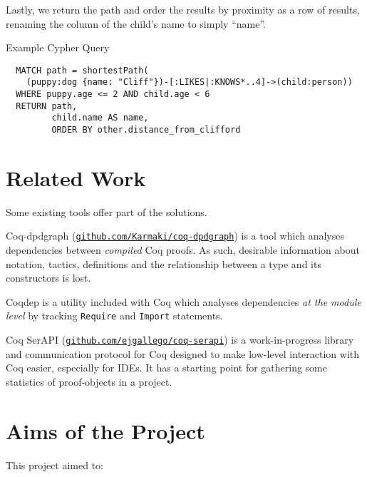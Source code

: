 Lastly, we return the path and order the results by proximity as a row of
results, renaming the column of the child's name to simply ``name''.

\begin{listing}[tb]%

\caption{Example Cypher Query}
\label{lst:cypherexample}

  \begin{verbatim}
  MATCH path = shortestPath(
    (puppy:dog {name: "Cliff"})-[:LIKES|:KNOWS*..4]->(child:person))
  WHERE puppy.age <= 2 AND child.age < 6
  RETURN path,
         child.name AS name,
         ORDER BY other.distance_from_clifford
  \end{verbatim}

\end{listing}

\section{Related Work}

Some existing tools offer part of the solutions.

Coq-dpdgraph
(\href{http://github.com/Karmaki/coq-dpdgraph}{\texttt{github.com/Karmaki/coq-dpdgraph}})
is a tool which analyses dependencies between \emph{compiled} Coq proofs. As
such, desirable information about notation, tactics, definitions and the
relationship between a type and its constructors is lost.

Coqdep is a utility included with Coq which analyses dependencies \emph{at the
module level} by tracking {\tt Require} and {\tt Import} statements.

Coq SerAPI
(\href{http://github.com/ejgallego/coq-serapi}{\texttt{github.com/ejgallego/coq-serapi}})
is a work-in-progress library and communication protocol for Coq designed to
make low-level interaction with Coq easier, especially for IDEs. It has a
starting point for gathering some statistics of proof-objects in a project.

\section{Aims of the Project}
\label{intro:aims}

This project aimed to:

